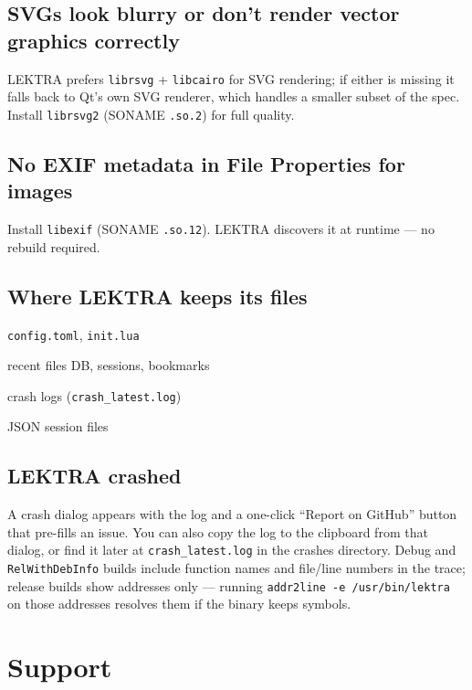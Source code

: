 \documentclass[a4paper,12pt]{article}
\begin{document}
\subsection{SVGs look blurry or don't render vector graphics correctly}
LEKTRA prefers \texttt{librsvg} + \texttt{libcairo} for SVG rendering; if either is missing it falls back to Qt's own SVG renderer, which handles a smaller subset of the spec. Install \texttt{librsvg2} (SONAME \texttt{.so.2}) for full quality.

\subsection{No EXIF metadata in File Properties for images}
Install \texttt{libexif} (SONAME \texttt{.so.12}). LEKTRA discovers it at runtime — no rebuild required.

\subsection{Where LEKTRA keeps its files}
\begin{description}[leftmargin=0pt]
    \item[\texttt{\$HOME/.config/lektra/}] \texttt{config.toml}, \texttt{init.lua}
    \item[\texttt{\$HOME/.local/share/lektra/}] recent files DB, sessions, bookmarks
    \item[\texttt{\$HOME/.local/share/lektra/crashes/}] crash logs (\texttt{crash\_latest.log})
    \item[\texttt{\$HOME/.local/share/lektra/sessions/}] JSON session files
\end{description}

\subsection{LEKTRA crashed}
A crash dialog appears with the log and a one-click ``Report on GitHub'' button that pre-fills an issue. You can also copy the log to the clipboard from that dialog, or find it later at \texttt{crash\_latest.log} in the crashes directory. Debug and \texttt{RelWithDebInfo} builds include function names and file/line numbers in the trace; release builds show addresses only — running \texttt{addr2line -e /usr/bin/lektra} on those addresses resolves them if the binary keeps symbols.

\section{Support}
\end{document}
